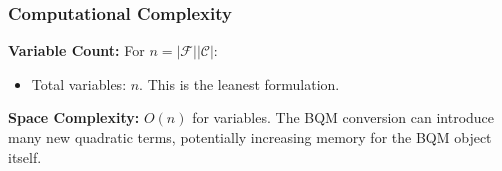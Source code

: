 \documentclass{article}
\begin{document}

\subsubsection{Computational Complexity}

\textbf{Variable Count:} For $n = |\mathcal{F}||\mathcal{C}|$:
\begin{itemize}
    \item Total variables: $n$. This is the leanest formulation.
\end{itemize}

\textbf{Space Complexity:} $O(n)$ for variables. The BQM conversion can introduce many new quadratic terms, potentially increasing memory for the BQM object itself.


\newpage
\end{document}
